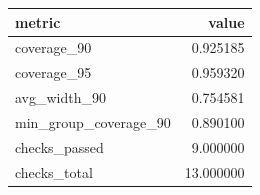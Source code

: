 \begin{tabular}{lr}
\toprule
metric & value \\
\midrule
coverage_90 & 0.925185 \\
coverage_95 & 0.959320 \\
avg_width_90 & 0.754581 \\
min_group_coverage_90 & 0.890100 \\
checks_passed & 9.000000 \\
checks_total & 13.000000 \\
\bottomrule
\end{tabular}
